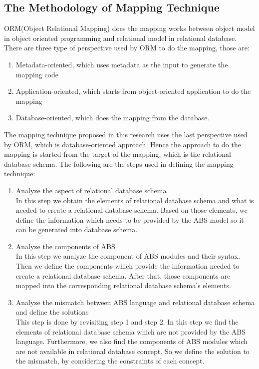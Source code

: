 \documentclass[runningheads,a4paper]{llncs}
\begin{document}
\subsection{The Methodology of Mapping Technique}
ORM(Object Relational Mapping) does the mapping works between object model in object oriented programming and relational model in relational database. There are three type of perspective used by ORM to do the mapping, those are:
\begin{enumerate}
	\item Metadata-oriented, which uses metadata as the input to generate the mapping code
	\item Application-oriented, which starts from object-oriented application to do the mapping
	\item Database-oriented, which does the mapping from the database.
\end{enumerate}

The mapping technique proposed in this research uses the last perspective used by ORM, which is database-oriented approach. Hence the approach to do the mapping is started from the target of the mapping, which is the relational database schema. The following are the steps used in defining the mapping technique:

\begin{enumerate}
	\item Analyze the aspect of relational database schema\\
	In this step we obtain the elements of relational database schema and what is needed to create a relational database schema. Based on those elements, we define the information which needs to be provided by the ABS model so it can be generated into database schema.
	\item Analyze the components of ABS\\
	In this step we analyze the component of ABS modules and their syntax. Then we define the components which provide the information needed to create a relational database schema. After that, those components are mapped into the corresponding relational database schema’s elements.
	\item Analyze the mismatch between ABS language and relational database schema and define the solutions\\
	This step is done by revisiting step 1 and step 2. In this step we find the elements of relational database schema which are not provided by the ABS language. Furthermore, we also find the components of ABS modules which are not available in relational database concept. So we define the solution to the mismatch, by considering the constraints of each concept.
\end{enumerate}
\end{document}
